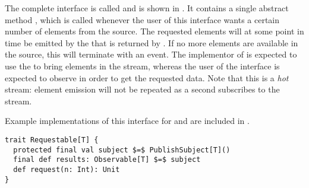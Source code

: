 The complete interface is called  and is shown in . It contains a single abstract method , which is called whenever the user of this interface wants a certain number of elements from the source. The requested elements will at some point in time be emitted by the \obs that is returned by . If no more elements are available in the source, this \obs will terminate with an  event. The implementor of  is expected to use the  to bring elements in the stream, whereas the user of the interface is expected to observe  in order to get the requested data. Note that this is a \emph{hot} stream: element emission will not be repeated as a second \obv subscribes to the stream.

Example implementations of this interface for \itr and  are included in .

\hspace*{-\parindent}
\begin{minipage}{\linewidth}
\begin{lstlisting}[style=ScalaStyle, caption={Universal, interactive interface used in the feedback system}, label={lst:universal-interactive-interface}]
trait Requestable[T] {
  protected final val subject $=$ PublishSubject[T]()
  final def results: Observable[T] $=$ subject
  def request(n: Int): Unit
}
\end{lstlisting}
\end{minipage}
